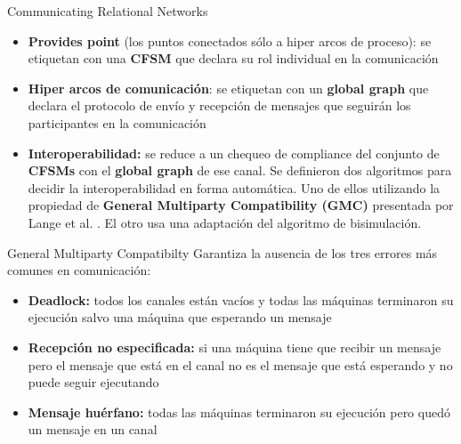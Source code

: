 \documentclass[10pt,xcolor={table,dvipsnames},t]{beamer}
\begin{document}
\begin{frame}{Communicating Relational Networks}
\begin{itemize}
    \item \textbf{Provides point} (los puntos conectados sólo a hiper arcos de proceso): se etiquetan con una \textbf{CFSM} que declara su rol individual en la comunicación
    \item \textbf{Hiper arcos de comunicación}: se etiquetan con un \textbf{global graph} que declara el protocolo de envío y recepción de mensajes que seguirán los participantes en la comunicación
    \item \textbf{Interoperabilidad:} se reduce a un chequeo de compliance del conjunto de \textbf{CFSMs} con el \textbf{global graph} de ese canal. Se definieron dos algoritmos para decidir la interoperabilidad en forma automática. Uno de ellos utilizando la propiedad de \textbf{General Multiparty Compatibility (GMC)} presentada por Lange et al. \cite{lange:popl15}. El otro usa una adaptación del algoritmo de bisimulación.
\end{itemize}
\end{frame}

\begin{frame}{General Multiparty Compatibilty}
Garantiza la ausencia de los tres errores más comunes en comunicación:
  \begin{itemize}
        \item \textbf{Deadlock:} todos los canales están vacíos y todas las máquinas terminaron su ejecución salvo una máquina que esperando un mensaje
        \item \textbf{Recepción no especificada:} si una máquina tiene que recibir un mensaje pero el mensaje que está en el canal no es el mensaje que está esperando y no puede seguir ejecutando
        \item \textbf{Mensaje huérfano:} todas las máquinas terminaron su ejecución pero quedó un mensaje en un canal
    \end{itemize}
\end{frame}
\end{document}
